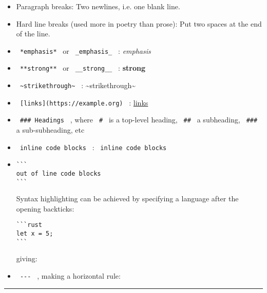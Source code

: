 \begin{itemize}
\item
  Paragraph breaks: Two newlines, i.e. one blank line.
\item
  Hard line breaks (used more in poetry than prose): Put two spaces at
  the end of the line.
\item
  \texttt{\ *emphasis*\ } or \texttt{\ \_emphasis\_\ } : \emph{emphasis}
\item
  \texttt{\ **strong**\ } or \texttt{\ \_\_strong\_\_\ } :
  \textbf{strong}
\item
  \texttt{\ \textasciitilde{}strikethrough\textasciitilde{}\ } :
  \textasciitilde strikethrough\textasciitilde{}
\item
  \texttt{\ {[}links{]}(https://example.org)\ } :
  \href{https://example.org/}{links}
\item
  \texttt{\ \#\#\#\ Headings\ } , where \texttt{\ \#\ } is a top-level
  heading, \texttt{\ \#\#\ } a subheading, \texttt{\ \#\#\#\ } a
  sub-subheading, etc
\item
  \texttt{\ \textasciigrave{}inline\ code\ blocks\textasciigrave{}\ } :
  \texttt{\ inline\ code\ blocks\ }
\item
\begin{verbatim}
```
out of line code blocks
```
\end{verbatim}

  Syntax highlighting can be achieved by specifying a language after the
  opening backticks:

\begin{verbatim}
```rust
let x = 5;
```
\end{verbatim}

  giving:

\begin{Shaded}
\begin{Highlighting}[]
\OperatorTok{=} \OperatorTok{;}
\end{Highlighting}
\end{Shaded}
\item
  \texttt{\ -\/-\/-\ } , making a horizontal rule:
\end{itemize}

\begin{center}\rule{0.5\linewidth}{0.5pt}\end{center}

